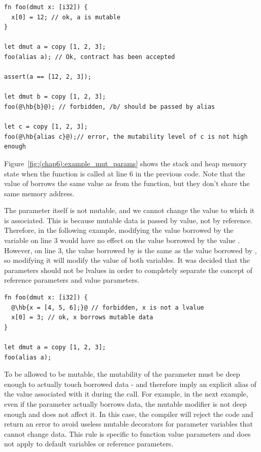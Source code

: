 \begin{lstlisting}[style=coloredverbatimError, escapechar=@]
fn foo(dmut x: [i32]) {
  x[0] = 12; // ok, a is mutable
}

let dmut a = copy [1, 2, 3];
foo(alias a); // Ok, contract has been accepted

assert(a == [12, 2, 3]);

let dmut b = copy [1, 2, 3];
foo(@\hb{b}@); // forbidden, /b/ should be passed by alias

let c = copy [1, 2, 3];
foo(@\hb{alias c}@);// error, the mutability level of c is not high enough
\end{lstlisting}

Figure~\ref{fig:(chap6):example_mut_params} shows the stack and heap memory state when
the  function is called at line 6 in the previous code. Note that
the value of  borrows the same value as  from the
 function, but they don't share the same memory address.



The parameter itself is not mutable, and we cannot change the value to which it
is associated. This is because mutable data is passed by value, not by
reference. Therefore, in the following example, modifying the value borrowed by
the variable  on line 3 would have no effect on the value borrowed by
the value . However, on line 3, the value borrowed by  is the
same as the value borrowed by , so modifying it will modify the value
of both variables. It was decided that the parameters should not be lvalues in
order to completely separate the concept of reference parameters and value
parameters.

\begin{lstlisting}[style=coloredverbatimError, escapechar=@]
fn foo(dmut x: [i32]) {
  @\hb{x = [4, 5, 6];}@ // forbidden, x is not a lvalue
  x[0] = 3; // ok, x borrows mutable data
}

let dmut a = copy [1, 2, 3];
foo(alias a);
\end{lstlisting}

To be allowed to be mutable, the mutability of the parameter must be deep enough
to actually touch borrowed data - and therefore imply an explicit alias of the
value associated with it during the call. For example, in the next example, even
if the parameter actually borrows data, the mutable modifier is not deep enough
and does not affect it. In this case, the compiler will reject the code and
return an error to avoid useless mutable decorators for parameter variables that
cannot change data. This rule is specific to function value parameters and does
not apply to default variables or reference parameters.

